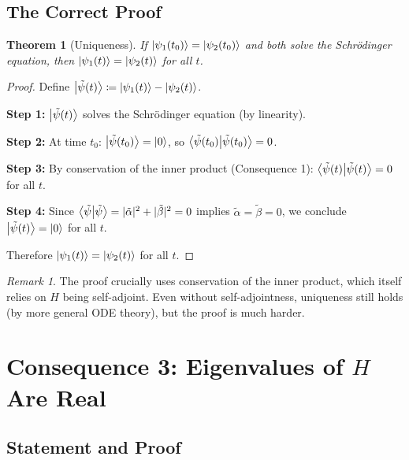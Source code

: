\documentclass[11pt,a4paper]{article}
\theoremstyle{definition}
\theoremstyle{plain}
\newtheorem{theorem}{Theorem}[section]
\theoremstyle{remark}
\newtheorem{remark}{Remark}[section]
\begin{document}
\subsection{The Correct Proof}

\begin{theorem}[Uniqueness]
    If $\ket{\psi_1(t_0)} = \ket{\psi_2(t_0)}$ and both solve the Schr\"odinger equation, then $\ket{\psi_1(t)} = \ket{\psi_2(t)}$ for all $t$.
\end{theorem}

\begin{proof}
    Define $\ket{\tilde{\psi}(t)} \coloneqq \ket{\psi_1(t)} - \ket{\psi_2(t)}$.

    \textbf{Step 1:} $\ket{\tilde{\psi}(t)}$ solves the Schr\"odinger equation (by linearity).

    \textbf{Step 2:} At time $t_0$: $\ket{\tilde{\psi}(t_0)} = \ket{0}$, so $\braket{\tilde{\psi}(t_0)}{\tilde{\psi}(t_0)} = 0$.

    \textbf{Step 3:} By conservation of the inner product (Consequence 1): $\braket{\tilde{\psi}(t)}{\tilde{\psi}(t)} = 0$ for all $t$.

    \textbf{Step 4:} Since $\braket{\tilde{\psi}}{\tilde{\psi}} = |\tilde{\alpha}|^2 + |\tilde{\beta}|^2 = 0$ implies $\tilde{\alpha} = \tilde{\beta} = 0$, we conclude $\ket{\tilde{\psi}(t)} = \ket{0}$ for all $t$.

    Therefore $\ket{\psi_1(t)} = \ket{\psi_2(t)}$ for all $t$. \qedhere
\end{proof}

\begin{remark}
    The proof crucially uses conservation of the inner product, which itself relies on $H$ being self-adjoint. Even without self-adjointness, uniqueness still holds (by more general ODE theory), but the proof is much harder.
\end{remark}

\section{Consequence 3: Eigenvalues of $H$ Are Real}

\subsection{Statement and Proof}
\end{document}
